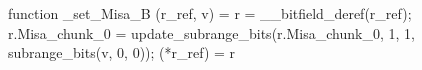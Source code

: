 function _set_Misa_B (r_ref, v) = {
    r = __bitfield_deref(r_ref);
    r.Misa_chunk_0 = update_subrange_bits(r.Misa_chunk_0, 1, 1, subrange_bits(v, 0, 0));
    (*r_ref) = r
}
